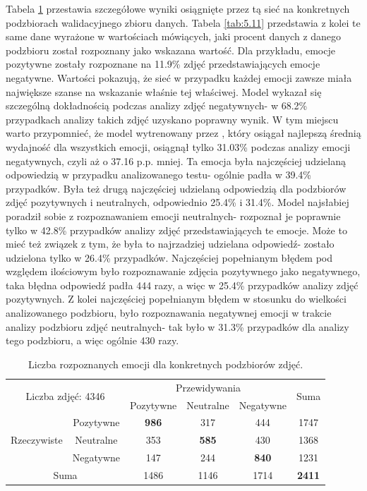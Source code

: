 Tabela \ref{tab:5.10} przestawia szczegółowe wyniki osiągnięte przez tą sieć na konkretnych podzbiorach walidacyjnego zbioru danych. Tabela \ref{tab:5.11} przedstawia z kolei te same dane wyrażone w wartościach mówiących, jaki procent danych z danego podzbioru został rozpoznany jako wskazana wartość. Dla przykładu, emocje pozytywne zostały rozpoznane na 11.9\% zdjęć przedstawiających emocje negatywne. Wartości pokazują, że sieć w przypadku każdej emocji zawsze miała największe szanse na wskazanie właśnie tej właściwej. Model wykazał się szczególną dokładnością podczas analizy zdjęć negatywnych- w 68.2\% przypadkach analizy takich zdjęć uzyskano poprawny wynik. W tym miejscu warto przypomnieć, że model wytrenowany przez \cite{GAD}, który osiągał najlepszą średnią wydajność dla wszystkich emocji, osiągnął tylko 31.03\% podczas analizy emocji negatywnych, czyli aż o 37.16 p.p. mniej. Ta emocja była najczęściej udzielaną odpowiedzią w przypadku analizowanego testu- ogólnie padła w 39.4\% przypadków. Była też drugą najczęściej udzielaną odpowiedzią dla podzbiorów zdjęć pozytywnych i neutralnych, odpowiednio 25.4\% i 31.4\%. Model najsłabiej poradził sobie z rozpoznawaniem emocji neutralnych- rozpoznał je poprawnie tylko w 42.8\% przypadków analizy zdjęć przedstawiających te emocje. Może to mieć też związek z tym, że była to najrzadziej udzielana odpowiedź- zostało udzielona tylko w 26.4\% przypadków. Najczęściej popełnianym błędem pod względem ilościowym było rozpoznawanie zdjęcia pozytywnego jako negatywnego, taka błędna odpowiedź padła 444 razy, a więc w 25.4\% przypadków analizy zdjęć pozytywnych. Z kolei najczęściej popełnianym błędem w stosunku do wielkości analizowanego podzbioru, było rozpoznawania negatywnej emocji w trakcie analizy podzbioru zdjęć neutralnych- tak było w 31.3\% przypadków dla analizy tego podzbioru, a więc ogólnie 430 razy. 

\begin{table}[H]
  \centering
  \caption{Liczba rozpoznanych emocji dla konkretnych podzbiorów zdjęć.}
    \begin{tabular}{ |cc|ccc|c| }
    \hline
    \multicolumn{2}{|c|}{\multirow{2}{*}{Liczba zdjęć: 4346}} & \multicolumn{3}{c|}{Przewidywania} & \multirow{2}{*}{Suma} \\
    && Pozytywne & Neutralne & \multicolumn{1}{c|}{Negatywne} & \\
    \hline
    \multirow{3}{*}{Rzeczywiste} & Pozytywne & \textbf{986} & 317 & 444 & 1747 \\
    & Neutralne & 353 & \textbf{585} & 430 & 1368 \\
    & Negatywne & 147 & 244 & \textbf{840} & 1231 \\
    \hline
    \multicolumn{2}{|c|}{Suma} & 1486 & 1146 & 1714 & \textbf{2411} \\
    \hline
    \end{tabular}
  \label{tab:5.10}
\end{table}

